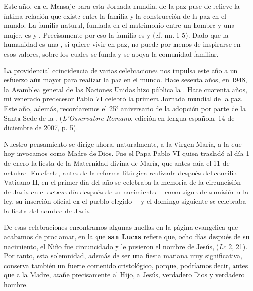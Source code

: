 Este año, en el Mensaje para esta Jornada mundial de la paz puse de relieve la íntima relación que existe entre la familia y la construcción de la paz en el mundo. La familia natural, fundada en el matrimonio entre un hombre y una mujer, es  y . Precisamente por eso la familia es  y  (cf. nn. 1-5). Dado que la humanidad es una , si quiere vivir en paz, no puede por menos de inspirarse en esos valores, sobre los cuales se funda y se apoya la comunidad familiar.

La providencial coincidencia de varias celebraciones nos impulsa este año a un esfuerzo aún mayor para realizar la paz en el mundo. Hace sesenta años, en 1948, la Asamblea general de las Naciones Unidas hizo pública la . Hace cuarenta años, mi venerado predecesor Pablo VI celebró la primera Jornada mundial de la paz. Este año, además, recordaremos el 25° aniversario de la adopción por parte de la Santa Sede de la .  (\emph{L'Osservatore Romano}, edición en lengua española, 14 de diciembre de 2007, p. 5).

Nuestro pensamiento se dirige ahora, naturalmente, a la Virgen María, a la que hoy invocamos como Madre de Dios. Fue el Papa Pablo VI quien trasladó al día 1 de enero la fiesta de la Maternidad divina de María, que antes caía el 11 de octubre. En efecto, antes de la reforma litúrgica realizada después del concilio Vaticano II, en el primer día del año se celebraba la memoria de la circuncisión de Jesús en el octavo día después de su nacimiento ---como signo de sumisión a la ley, su inserción oficial en el pueblo elegido--- y el domingo siguiente se celebraba la fiesta del nombre de Jesús.

De esas celebraciones encontramos algunas huellas en la página evangélica que acabamos de proclamar, en la que \textbf{san Lucas} refiere que, ocho días después de su nacimiento, el Niño fue circuncidado y le pusieron el nombre de Jesús,  (\emph{Lc} 2, 21). Por tanto, esta solemnidad, además de ser una fiesta mariana muy significativa, conserva también un fuerte contenido cristológico, porque, podríamos decir, antes que a la Madre, atañe precisamente al Hijo, a Jesús, verdadero Dios y verdadero hombre.

